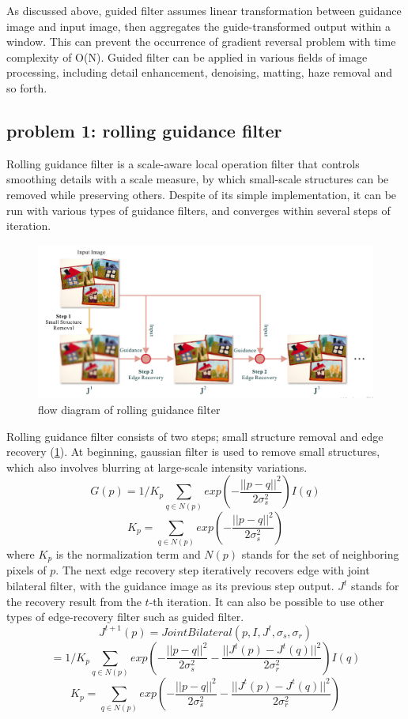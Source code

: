 \documentclass[extendedabs]{bmvc2k}
\begin{document}
As discussed above, guided filter assumes linear transformation between guidance image and
input image, then aggregates the guide-transformed output within a window. This can prevent the
occurrence of gradient reversal problem with time complexity of O(N).
Guided filter can be applied in various fields of image processing, including detail
enhancement, denoising, matting, haze removal and so forth.

\pagebreak
\subsection*{problem 1: rolling guidance filter}

Rolling guidance filter \cite{rolling} is a scale-aware local operation filter that controls smoothing
details with a scale measure, by which small-scale structures can be removed while preserving others.
Despite of its simple implementation, it can be run with various types of guidance filters, and 
converges within several steps of iteration.

\begin{figure}[h]
    \centering
    \includegraphics[width=\linewidth]{hw2_1_6}
    \caption{flow diagram of rolling guidance filter}
    \label{fig:6}
\end{figure}

Rolling guidance filter consists of two steps; small structure removal and 
edge recovery (\figurename{\ref{fig:6}}).
At beginning, gaussian filter is used to remove small structures, which also involves blurring at
large-scale intensity variations.
\[G(p) = 1/K_p\sum_{q \in N(p)}exp(-\frac{||p-q||^2}{2\sigma_s^2})I(q)\]
\[K_p = \sum_{q \in N(p)}exp(-\frac{||p-q||^2}{2\sigma_s^2})\]
where $K_p$ is the normalization term and $N(p)$ stands for the set of neighboring pixels of $p$.
The next edge recovery step iteratively recovers edge with joint bilateral filter, with the guidance
image as its previous step output. $J^t$ stands for the recovery result from the $t$-th iteration.
It can also be possible to use other types of edge-recovery filter such as guided filter.
\[J^{t+1}(p) = JointBilateral(p, I, J^t, \sigma_s, \sigma_r)\]
\[= 1/K_p\sum_{q \in N(p)}exp(-\frac{||p-q||^2}{2\sigma_s^2}-\frac{||J^t(p)-J^t(q)||^2}{2\sigma_r^2})I(q)\]
\[K_p = \sum_{q \in N(p)}exp(-\frac{||p-q||^2}{2\sigma_s^2}-\frac{||J^t(p)-J^t(q)||^2}{2\sigma_r^2})\]
\end{document}
